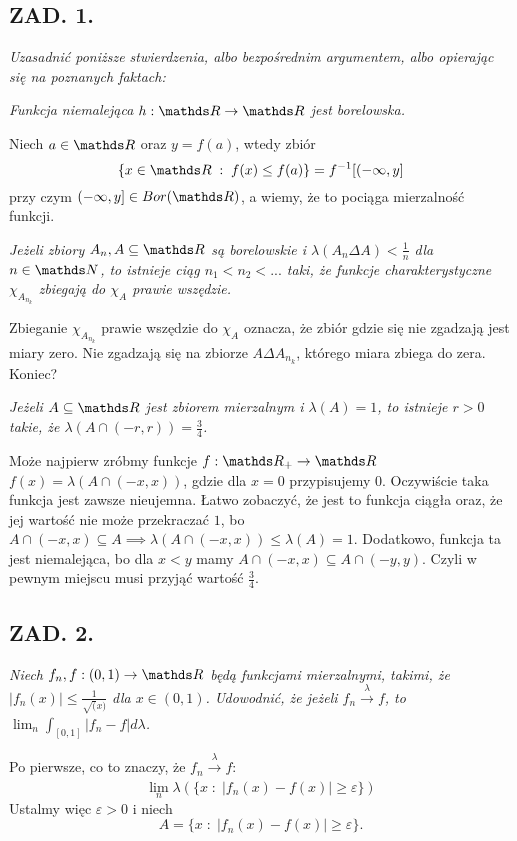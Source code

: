 \documentclass{article}
\begin{document}
\subsection*{ZAD. 1.}
\emph{Uzasadnić poniższe stwierdzenia, albo bezpośrednim argumentem, albo opierając się na poznanych faktach:}
\medskip

\emph{\color{def}Funkcja niemalejąca $h:\R\to\R$ jest borelowska.}
\smallskip

Niech $a\in \R$ oraz $y=f(a)$, wtedy zbiór
$$\{x\in\R\;:\;f(x)\leq f(a)\}=f^{-1}[(-\infty,y]$$
przy czym $(-\infty,y]\in Bor(\R)$, a wiemy, że to pociąga mierzalność funkcji.
\medskip

\emph{\color{def}Jeżeli zbiory $A_n,A\subseteq \R$ są borelowskie i $\lambda(A_n\Delta A)<\frac1n$ dla $n\in\N$, to istnieje ciąg $n_1<n_2<...$ taki, że funkcje charakterystyczne $\chi_{A_{n_k}}$ zbiegają do $\chi_A$ prawie wszędzie.}
\medskip

Zbieganie $\chi_{A_{n_k}}$ prawie wszędzie do $\chi_A$ oznacza, że zbiór gdzie się nie zgadzają jest miary zero. Nie zgadzają się na zbiorze $A\Delta A_{n_k}$, którego miara zbiega do zera. Koniec?
\medskip

\emph{\color{def}Jeżeli $A\subseteq\R$ jest zbiorem mierzalnym i $\lambda(A)=1$, to istnieje $r>0$ takie, że $\lambda(A\cap(-r,r))=\frac34$.}
\medskip

Może najpierw zróbmy funkcje $f:\R_+\to\R$ $f(x)=\lambda(A\cap(-x,x))$, gdzie dla $x=0$ przypisujemy $0$. Oczywiście taka funkcja jest zawsze nieujemna. Łatwo zobaczyć, że jest to funkcja ciągła oraz, że jej wartość nie może przekraczać $1$, bo $A\cap(-x,x)\subseteq A\implies \lambda(A\cap(-x,x))\leq\lambda(A)=1$. Dodatkowo, funkcja ta jest niemalejąca, bo dla $x<y$ mamy $A\cap(-x,x)\subseteq A\cap(-y,y)$. Czyli w pewnym miejscu musi przyjąć wartość $\frac34$.

\subsection*{ZAD. 2.}
\emph{Niech $f_n,f:(0,1)\to\R$ będą funkcjami mierzalnymi, takimi, że $|f_n(x)|\leq\frac1{\sqrt(x)}$ dla $x\in(0,1)$. Udowodnić, że jeżeli $f_n\xrightarrow[]{\lambda}f$, to $\lim_n\int_{[0,1]}|f_n-f|d\lambda$.}
\medskip

Po pierwsze, co to znaczy, że $f_n\xrightarrow[]{\lambda}f$:
$$\lim_n\lambda(\{x\;:\;|f_n(x)-f(x)|\geq\varepsilon\})$$
Ustalmy więc $\varepsilon>0$ i niech 
$$A=\{x\;:\;|f_n(x)-f(x)|\geq\varepsilon\}.$$
\end{document}
